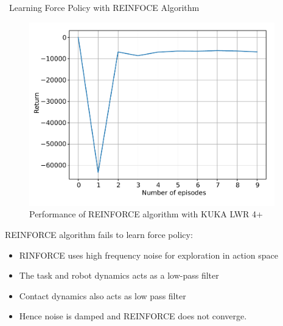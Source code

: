 \documentclass[aspectratio=43,10pt,fleqn,t]{beamer}
\begin{document}
\begin{frame}{~}{\small Learning Force Policy with REINFOCE Algorithm}

	\begin{minipage}[t]{0.51\textwidth}
		\begin{figure}
			\includegraphics[width=0.95\textwidth]{images/exp/cut/reinf_returnn}
			\caption{\scriptsize Performance of REINFORCE algorithm with KUKA LWR 4+}
		\end{figure}
	\end{minipage}
	\hfill
	\begin{minipage}[t]{0.47\textwidth}
		\scriptsize
		\vspace{0.5cm}
		REINFORCE algorithm fails to learn force policy:
		\begin{itemize}
			\scriptsize 
			\item RINFORCE uses high frequency noise for exploration in action space
			\item The task and robot dynamics acts as a low-pass filter
			\item Contact dynamics also acts as low pass filter
			\item Hence noise is damped and REINFORCE does not converge.
		\end{itemize}
	\end{minipage}
\end{frame}
\end{document}
